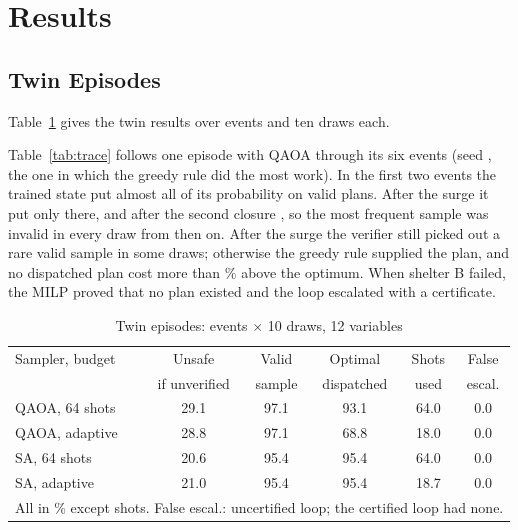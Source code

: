 \documentclass[conference]{IEEEtran}
\begin{document}
\section{Results}
\subsection{Twin Episodes}
Table~\ref{tab:twin} gives the twin results over \TwinEvents{} events and ten draws each. \TwinText{} \StatText{}

Table~\ref{tab:trace} follows one episode with QAOA through its six events (seed \TraceSeedNo, the one in which the greedy rule did the most work). In the first two events the trained state put almost all of its probability on valid plans. After the surge it put only \TracePfTwo{} there, and after the second closure \TracePfThree{}, so the most frequent sample was invalid in every draw from then on. After the surge the verifier still picked out a rare valid sample in some draws; otherwise the greedy rule supplied the plan, and no dispatched plan cost more than \TraceGreedyGap\% above the optimum. When shelter B failed, the MILP proved that no plan existed and the loop escalated with a certificate.



\begin{table}[t]
\caption{Twin episodes: \TwinEvents{} events $\times$ 10 draws, 12 variables}
\label{tab:twin}
\centering
\footnotesize
\setlength{\tabcolsep}{2.2pt}
\begin{tabular}{lccccc}
\toprule
Sampler, budget & Unsafe & Valid & Optimal & Shots & False\\
 & if unverified & sample & dispatched & used & escal.\\
\midrule
QAOA, 64 shots & 29.1 & 97.1 & 93.1 & 64.0 & 0.0\\
QAOA, adaptive & 28.8 & 97.1 & 68.8 & 18.0 & 0.0\\
SA, 64 shots & 20.6 & 95.4 & 95.4 & 64.0 & 0.0\\
SA, adaptive & 21.0 & 95.4 & 95.4 & 18.7 & 0.0\\
\bottomrule
\multicolumn{6}{l}{\scriptsize All in \% except shots. False escal.: uncertified loop; the certified loop had none.}\\
\end{tabular}
\end{table}
\end{document}
